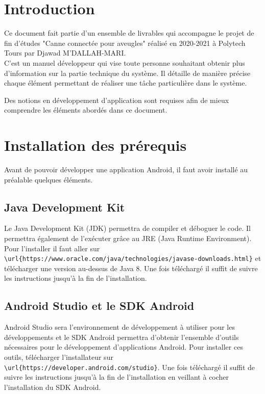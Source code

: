 \documentclass[UTF8]{EPURapport}
\begin{document}
\chapter{Introduction}

Ce document fait partie d'un ensemble de livrables qui accompagne le projet de fin d'études "Canne connectée pour aveugles" réalisé en 2020-2021 à Polytech Tours par Djawad M'DALLAH-MARI.\\

C'est un manuel développeur qui vise toute personne souhaitant obtenir plus d'information sur la partie technique du système. Il détaille de manière précise chaque élément permettant de réaliser une tâche particulière dans le système.

Des notions en développement d'application sont requises afin de mieux comprendre les éléments abordés dans ce document.

\chapter{Installation des prérequis}
Avant de pouvoir développer une application Android, il faut avoir installé au préalable quelques éléments.

\section{Java Development Kit}
Le Java Development Kit (JDK) permettra de compiler et déboguer le code. Il permettra également de l'exécuter grâce au JRE (Java Runtime Environment).\\

Pour l'installer il faut aller sur \verb|\url{https://www.oracle.com/java/technologies/javase-downloads.html}| et télécharger une version au-dessus de Java 8. Une fois téléchargé il suffit de suivre les instructions jusqu'à la fin de l'installation.

\section{Android Studio et le SDK Android}
Android Studio sera l'environnement de développement à utiliser pour les développements et le SDK Android permettra d'obtenir l'ensemble d'outils nécessaires pour le développement d'applications Android. Pour installer ces outils, télécharger l'installateur sur \verb|\url{https://developer.android.com/studio}|. Une fois téléchargé il suffit de suivre les instructions jusqu'à la fin de l'installation en veillant à cocher l'installation du SDK Android.
\end{document}
